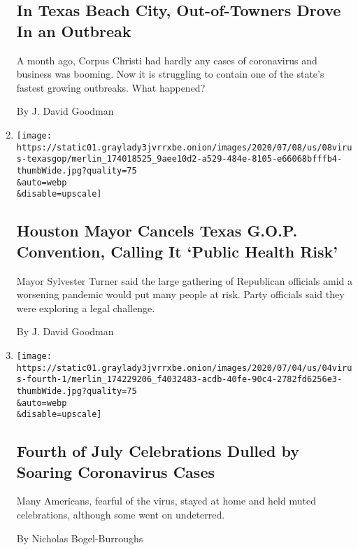 \begin{enumerate}
{  \subsection{In Texas Beach City, Out-of-Towners Drove In an
  Outbreak}\label{in-texas-beach-city-out-of-towners-drove-in-an-outbreak}}

  A month ago, Corpus Christi had hardly any cases of coronavirus and
  business was booming. Now it is struggling to contain one of the
  state's fastest growing outbreaks. What happened?

  By J. David Goodman
\item
  \href{/2020/07/08/us/coronavirus-texas-republican-convention-gop.html}{}

  \texttt{[image: https://static01.graylady3jvrrxbe.onion/images/2020/07/08/us/08virus-texasgop/merlin\_174018525\_9aee10d2-a529-484e-8105-e66068bfffb4-thumbWide.jpg?quality=75\\\&auto=webp\\\&disable=upscale]}

  \hypertarget{houston-mayor-cancels-texas-gop-convention-calling-it-public-health-risk}{%
  \subsection{Houston Mayor Cancels Texas G.O.P. Convention, Calling It
  `Public Health
  Risk'}\label{houston-mayor-cancels-texas-gop-convention-calling-it-public-health-risk}}

  Mayor Sylvester Turner said the large gathering of Republican
  officials amid a worsening pandemic would put many people at risk.
  Party officials said they were exploring a legal challenge.

  By J. David Goodman
\item
  \href{/2020/07/04/us/july-fourth-celebrations-coronavirus.html}{}

  \texttt{[image: https://static01.graylady3jvrrxbe.onion/images/2020/07/04/us/04virus-fourth-1/merlin\_174229206\_f4032483-acdb-40fe-90c4-2782fd6256e3-thumbWide.jpg?quality=75\\\&auto=webp\\\&disable=upscale]}

  \hypertarget{fourth-of-july-celebrations-dulled-by-soaring-coronavirus-cases}{%
  \subsection{Fourth of July Celebrations Dulled by Soaring Coronavirus
  Cases}\label{fourth-of-july-celebrations-dulled-by-soaring-coronavirus-cases}}

  Many Americans, fearful of the virus, stayed at home and held muted
  celebrations, although some went on undeterred.

  By Nicholas Bogel-Burroughs
\end{enumerate}

